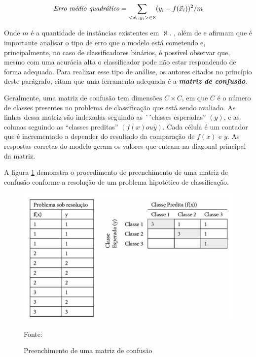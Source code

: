 \begin{equation}\label{erro_quadratico_medio}
\textrm{\textit{Erro médio quadrático}}=\sum_{<\vec{x}_i, y_i> \in \aleph} (y_i - f(\vec{x}_i))^2/m
\end{equation}

Onde $m$ é a quantidade de instâncias existentes em $\aleph$. \cite{Boscarioli2017}, \cite{amaral_introducao_2018} além de \cite{deng_improved_2016} e \cite{ruuska_evaluation_2018} afirmam que é importante analisar o tipo de erro que o modelo está cometendo e, principalmente, no caso de classificadores binários, é possível observar que, mesmo com uma acurácia alta o classificador pode não estar respondendo de forma adequada. Para realizar esse tipo de análise, os autores citados no princípio deste parágrafo, citam que uma ferramenta adequada é a \textit{\textbf{matriz de confusão}}. 

Geralmente, uma matriz de confusão tem dimensões $C \times C$, em que $C$ é o número de classes presentes no problema de classificação que está sendo avaliado. As linhas dessa matriz são indexadas seguindo as ´´classes esperadas'' $(y)$, e as colunas seguindo as ``classes preditas'' $(f(x) ou \hat{y})$. Cada célula é um contador que é incrementado a depender do resultado da comparação de $f(x)$ e $y$. As respostas corretas do modelo geram os valores que entram na diagonal principal da matriz. \cite[p. 130]{Boscarioli2017}

A figura \ref{fig:matriz_confusao} demonstra o procedimento de preenchimento de uma matriz de confusão conforme a resolução de um problema hipotético de classificação.

\begin{figure}[h!]
	\centering
	\includegraphics[width=.8\textwidth]{imagens/confusion_matrix.png}
	\caption{Preenchimento de uma matriz de confusão}
	{\scriptsize Fonte: \cite[p. 130]{Boscarioli2017}}
	\label{fig:matriz_confusao}
\end{figure}

